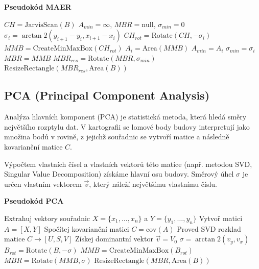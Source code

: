 \textbf{Pseudokód MAER}
\begin{algorithm}[H]
\caption{Minimum Area Enclosing Rectangle ($B$)}
\label{alg:MAER}
\begin{algorithmic}[1]
\State $CH = \text{JarvisScan}(B)$
\State $A_{min} = \infty$, $MBR = \text{null}$, $\sigma_{min} = 0$
    \State $\sigma_i = \arctan2(y_{i+1} - y_i, x_{i+1} - x_i)$
    \State $CH_{rot} = \text{Rotate}(CH, -\sigma_i)$
    \State $MMB = \text{CreateMinMaxBox}(CH_{rot})$
    \State $A_i = \text{Area}(MMB)$
        \State $A_{min} = A_i$
        \State $\sigma_{min} = \sigma_i$
        \State $MBR = MMB$
    \EndIf
\EndFor
\State $MBR_{res} = \text{Rotate}(MBR, \sigma_{min})$
\State \Return $\text{ResizeRectangle}(MBR_{res}, \text{Area}(B))$
\end{algorithmic}
\end{algorithm}




\subsection{PCA (Principal Component Analysis)}

Analýza hlavních komponent (PCA) je statistická metoda, která hledá směry největšího rozptylu dat. V kartografii se lomové body budovy interpretují jako množina bodů v rovině, z jejichž souřadnic se vytvoří matice a následně kovarianční matice $C$.

Výpočtem vlastních čísel a vlastních vektorů této matice (např. metodou SVD, Singular Value Decomposition) získáme hlavní osu budovy. Směrový úhel $\sigma$ je určen vlastním vektorem $\vec{v}$, který náleží největšímu vlastnímu číslu.

\newpage
\textbf{Pseudokód PCA}
\begin{algorithm}[H]
\caption{PCA ($B = \{p_1, \dots, p_n\}$)}
\label{alg:PCA}
\begin{algorithmic}[1]
\State Extrahuj vektory souřadnic $X = \{x_1, \dots, x_n\}$ a $Y = \{y_1, \dots, y_n\}$
\State Vytvoř matici $A = [X, Y]$
\State Spočítej kovarianční matici $C = \text{cov}(A)$
\State Proved SVD rozklad matice $C \rightarrow [U, S, V]$
\State Získej dominantní vektor $\vec{v} = V_0$
\State $\sigma = \arctan2(v_y, v_x)$
\State $B_{rot} = \text{Rotate}(B, -\sigma)$
\State $MMB = \text{CreateMinMaxBox}(B_{rot})$
\State $MBR = \text{Rotate}(MMB, \sigma)$
\State \Return $\text{ResizeRectangle}(MBR, \text{Area}(B))$
\end{algorithmic}
\end{algorithm}





